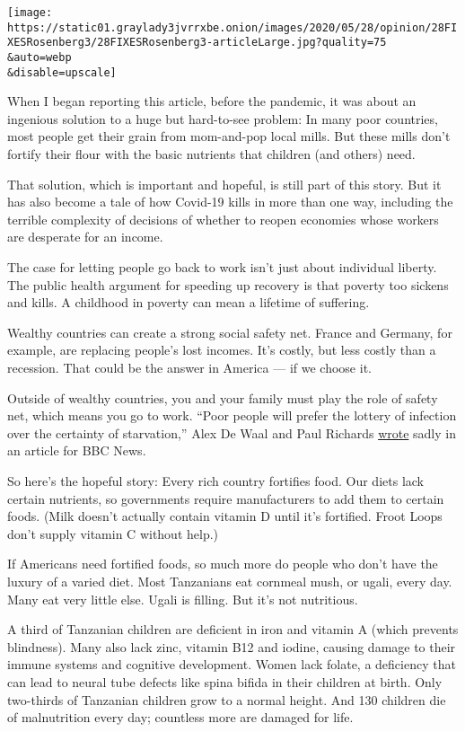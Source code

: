 \texttt{[image: https://static01.graylady3jvrrxbe.onion/images/2020/05/28/opinion/28FIXESRosenberg3/28FIXESRosenberg3-articleLarge.jpg?quality=75\\\&auto=webp\\\&disable=upscale]}

When I began reporting this article, before the pandemic, it was about
an ingenious solution to a huge but hard-to-see problem: In many poor
countries, most people get their grain from mom-and-pop local mills. But
these mills don't fortify their flour with the basic nutrients that
children (and others) need.

That solution, which is important and hopeful, is still part of this
story. But it has also become a tale of how Covid-19 kills in more than
one way, including the terrible complexity of decisions of whether to
reopen economies whose workers are desperate for an income.

The case for letting people go back to work isn't just about individual
liberty. The public health argument for speeding up recovery is that
poverty too sickens and kills. A childhood in poverty can mean a
lifetime of suffering.

Wealthy countries can create a strong social safety net. France and
Germany, for example, are replacing people's lost incomes. It's costly,
but less costly than a recession. That could be the answer in America
--- if we choose it.

Outside of wealthy countries, you and your family must play the role of
safety net, which means you go to work. ``Poor people will prefer the
lottery of infection over the certainty of starvation,'' Alex De Waal
and Paul Richards
\href{https://www.bbc.com/news/world-africa-52268320}{wrote} sadly in an
article for BBC News.

So here's the hopeful story: Every rich country fortifies food. Our
diets lack certain nutrients, so governments require manufacturers to
add them to certain foods. (Milk doesn't actually contain vitamin D
until it's fortified. Froot Loops don't supply vitamin C without help.)

If Americans need fortified foods, so much more do people who don't have
the luxury of a varied diet. Most Tanzanians eat cornmeal mush, or
ugali, every day. Many eat very little else. Ugali is filling. But it's
not nutritious.

A third of Tanzanian children are deficient in iron and vitamin A (which
prevents blindness). Many also lack zinc, vitamin B12 and iodine,
causing damage to their immune systems and cognitive development. Women
lack folate, a deficiency that can lead to neural tube defects like
spina bifida in their children at birth. Only two-thirds of Tanzanian
children grow to a normal height. And 130 children die of malnutrition
every day; countless more are damaged for life.

